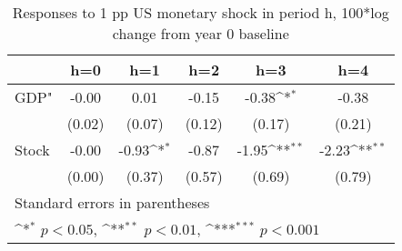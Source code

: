 \begin{table}[htbp]\centering
\def\sym#1{\ifmmode^{#1}\else\(^{#1}\)\fi}
\caption{Responses to 1 pp US monetary shock in period h, 100*log change from year 0 baseline}
\begin{tabular}{l*{5}{c}}
\hline\hline
            &\multicolumn{1}{c}{h=0}&\multicolumn{1}{c}{h=1}&\multicolumn{1}{c}{h=2}&\multicolumn{1}{c}{h=3}&\multicolumn{1}{c}{h=4}\\
\hline
GDP"        &       -0.00         &        0.01         &       -0.15         &       -0.38\sym{*}  &       -0.38         \\
            &      (0.02)         &      (0.07)         &      (0.12)         &      (0.17)         &      (0.21)         \\
[1em]
Stock       &       -0.00         &       -0.93\sym{*}  &       -0.87         &       -1.95\sym{**} &       -2.23\sym{**} \\
            &      (0.00)         &      (0.37)         &      (0.57)         &      (0.69)         &      (0.79)         \\
\hline\hline
\multicolumn{6}{l}{\footnotesize Standard errors in parentheses}\\
\multicolumn{6}{l}{\footnotesize \sym{*} \(p<0.05\), \sym{**} \(p<0.01\), \sym{***} \(p<0.001\)}\\
\end{tabular}
\end{table}
